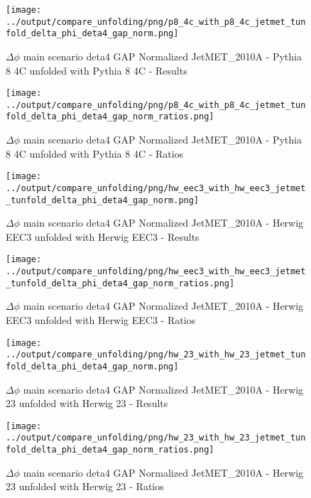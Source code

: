 \documentclass[11pt]{book}
\begin{document}
\begin{figure}[ht]
\centering
\texttt{[image: ../output/compare\_unfolding/png/p8\_4c\_with\_p8\_4c\_jetmet\_tunfold\_delta\_phi\_deta4\_gap\_norm.png]}
\caption{$\Delta\phi$ main scenario deta4 GAP Normalized JetMET\_2010A - Pythia 8 4C unfolded with Pythia 8 4C - Results}
\label{p8_p8_jetmet_tunfold_delta_phi_deta4_gap_norm_a}
\end{figure}

\begin{figure}[ht]
\centering
\texttt{[image: ../output/compare\_unfolding/png/p8\_4c\_with\_p8\_4c\_jetmet\_tunfold\_delta\_phi\_deta4\_gap\_norm\_ratios.png]}
\caption{$\Delta\phi$ main scenario deta4 GAP Normalized JetMET\_2010A - Pythia 8 4C unfolded with Pythia 8 4C - Ratios}
\label{p8_p8_jetmet_tunfold_delta_phi_deta4_gap_norm_b}
\end{figure}

\begin{figure}[ht]
\centering
\texttt{[image: ../output/compare\_unfolding/png/hw\_eec3\_with\_hw\_eec3\_jetmet\_tunfold\_delta\_phi\_deta4\_gap\_norm.png]}
\caption{$\Delta\phi$ main scenario deta4 GAP Normalized JetMET\_2010A - Herwig EEC3 unfolded with Herwig EEC3 - Results}
\label{hw_eec3_hw_eec3_jetmet_tunfold_delta_phi_deta4_gap_norm_a}
\end{figure}

\begin{figure}[ht]
\centering
\texttt{[image: ../output/compare\_unfolding/png/hw\_eec3\_with\_hw\_eec3\_jetmet\_tunfold\_delta\_phi\_deta4\_gap\_norm\_ratios.png]}
\caption{$\Delta\phi$ main scenario deta4 GAP Normalized JetMET\_2010A - Herwig EEC3 unfolded with Herwig EEC3 - Ratios}
\label{hw_eec3_hw_eec3_jetmet_tunfold_delta_phi_deta4_gap_norm_b}
\end{figure}

\begin{figure}[ht]
\centering
\texttt{[image: ../output/compare\_unfolding/png/hw\_23\_with\_hw\_23\_jetmet\_tunfold\_delta\_phi\_deta4\_gap\_norm.png]}
\caption{$\Delta\phi$ main scenario deta4 GAP Normalized JetMET\_2010A - Herwig 23 unfolded with Herwig 23 - Results}
\label{hw_23_hw_23_jetmet_tunfold_delta_phi_deta4_gap_norm_a}
\end{figure}

\begin{figure}[ht]
\centering
\texttt{[image: ../output/compare\_unfolding/png/hw\_23\_with\_hw\_23\_jetmet\_tunfold\_delta\_phi\_deta4\_gap\_norm\_ratios.png]}
\caption{$\Delta\phi$ main scenario deta4 GAP Normalized JetMET\_2010A - Herwig 23 unfolded with Herwig 23 - Ratios}
\label{hw_23_hw_23_jetmet_tunfold_delta_phi_deta4_gap_norm_b}
\end{figure}
\end{document}
